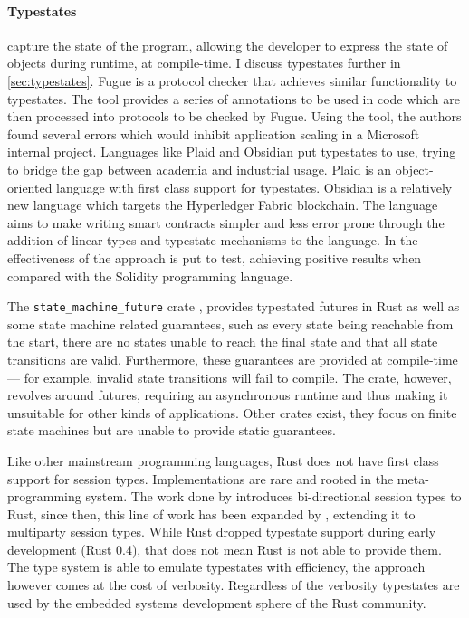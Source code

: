 \paragraph{Typestates} capture the state of the program,
allowing the developer to express the state of objects during runtime, at compile-time.
I discuss typestates further in \autoref{sec:typestates}.
Fugue \autocite{DeLine2004} is a protocol checker that achieves similar functionality to typestates.
The tool provides a series of annotations to be used in code which are then processed into protocols to be checked by Fugue.
Using the tool, the authors found several errors which would inhibit application scaling in a Microsoft internal project.
Languages like Plaid \autocite{Aldrich2009} and Obsidian \autocite{Coblenz2020, Coblenz2020a} put typestates to use,
trying to bridge the gap between academia and industrial usage.
Plaid is an object-oriented language with first class support for typestates.
Obsidian is a relatively new language which targets the Hyperledger Fabric blockchain.
The language aims to make writing smart contracts simpler and less error prone
through the addition of linear types and typestate mechanisms to the language.
In \autocite{Coblenz2020} the effectiveness of the approach is put to test,
achieving positive results when compared with the Solidity programming language.

The \texttt{state\_machine\_future} crate \autocite{Fitzgerald2019}, provides typestated futures in Rust as well as some state machine related guarantees,
such as every state being reachable from the start,
there are no states unable to reach the final state and that all state transitions are valid.
Furthermore, these guarantees are provided at compile-time --- for example, invalid state transitions will fail to compile.
The crate, however, revolves around futures, requiring an asynchronous runtime and thus making it unsuitable for other kinds of applications.
Other crates exist, they focus on finite state machines but are unable to provide static guarantees.

Like other mainstream programming languages, Rust does not have first class support for session types.
Implementations are rare and rooted in the meta-programming system.
The work done by \autocite{Jespersen2015, Munksgaard2015} introduces bi-directional session types to Rust,
since then, this line of work has been expanded by \autocite{Lagaillardie2020}, extending it to multiparty session types.
While Rust dropped typestate support during early development (Rust 0.4), that does not mean Rust is not able to provide them.
The type system is able to emulate typestates with efficiency, the approach however comes at the cost of verbosity.
Regardless of the verbosity typestates are used by the embedded systems development sphere of the Rust community.


